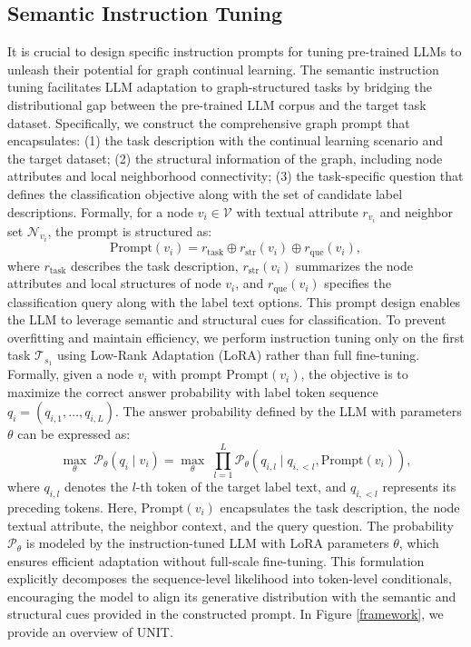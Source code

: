 \documentclass[sigconf]{acmart}
\begin{document}
\subsection{Semantic Instruction Tuning}
It is crucial to design specific instruction prompts for tuning pre-trained LLMs to unleash their potential for graph continual learning.
The semantic instruction tuning facilitates LLM adaptation to graph-structured tasks by bridging the distributional gap between the pre-trained LLM corpus and the target task dataset.
Specifically, we construct the comprehensive graph prompt that encapsulates: (1) the task description with the continual learning scenario and the target dataset; 
(2) the structural information of the graph, including node attributes and local neighborhood connectivity;
(3) the task-specific question that defines the classification objective along with the set of candidate label descriptions.
Formally, for a node $v_i \in \mathcal{V}$ with textual attribute $r_{v_i}$ and neighbor set $\mathcal{N}_{v_i}$, the prompt is structured as:
\begin{equation}
    \text{Prompt}(v_i) = r_{\text{task}} \oplus r_{\text{str}}(v_i) \oplus r_{\text{que}}(v_i),
\end{equation}
where $r_{\text{task}}$ describes the task description, $r_{\text{str}}(v_i)$ summarizes the node attributes and local structures of node $v_i$, and $r_{\text{que}}(v_i)$ specifies the classification query along with the label text options. 
This prompt design enables the LLM to leverage semantic and structural cues for classification.
To prevent overfitting and maintain efficiency, we perform instruction tuning only on the first task $\mathcal{T}_{s_1}$ using Low-Rank Adaptation (LoRA) \cite{lora} rather than full fine-tuning. 
Formally, given a node $v_i$ with prompt $\text{Prompt}(v_i)$, the objective is to maximize the correct answer probability with label token sequence $q_i = (q_{i,1}, \ldots, q_{i,L})$. 
The answer probability defined by the LLM with parameters $\theta$ can be expressed as:
\begin{equation}
\max_{\theta} \; \mathcal{P}_{\theta}\!\left(q_i \mid v_i\right) 
= \max_{\theta} \; \prod_{l=1}^{L} \mathcal{P}_{\theta}\!\left(q_{i,l} \mid q_{i,<l}, \text{Prompt}(v_i)\right),
\end{equation}
where $q_{i,l}$ denotes the $l$-th token of the target label text, and $q_{i,<l}$ represents its preceding tokens. 
Here, $\text{Prompt}(v_i)$ encapsulates the task description, the node textual attribute, the neighbor context, and the query question. 
The probability $\mathcal{P}_{\theta}$ is modeled by the instruction-tuned LLM with LoRA parameters $\theta$, which ensures efficient adaptation without full-scale fine-tuning. 
This formulation explicitly decomposes the sequence-level likelihood into token-level conditionals, encouraging the model to align its generative distribution with the semantic and structural cues provided in the constructed prompt.
In Figure \ref{framework}, we provide an overview of UNIT.
\end{document}
